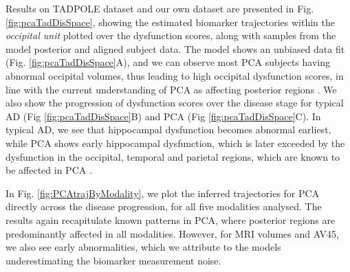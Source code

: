 \documentclass{llncs}
\begin{document}




Results on TADPOLE dataset and our own dataset are presented in Fig. \ref{fig:pcaTadDisSpace}, showing the estimated biomarker trajectories within the \emph{occipital unit} plotted over the dysfunction scores, along with samples from the model posterior and aligned subject data. The model shows an unbiased data fit (Fig. \ref{fig:pcaTadDisSpace}A), and we can observe most PCA subjects having abnormal occipital volumes, thus leading to high occipital dysfunction scores, in line with the current understanding of PCA as affecting posterior regions \cite{crutch2012posterior}. We also show the progression of dysfunction scores over the disease stage for typical AD (Fig \ref{fig:pcaTadDisSpace}B) and PCA (Fig \ref{fig:pcaTadDisSpace}C). In typical AD, we see that hippocampal dysfunction becomes abnormal earliest, while PCA shows early hippocampal dysfunction, which is later exceeded by the dysfunction in the occipital, temporal and parietal regions, which are known to be affected in PCA \cite{crutch2012posterior}. 

In Fig. \ref{fig:PCAtrajByModality}, we plot the inferred trajectories for PCA directly across the disease progression, for all five modalities analysed. The results again recapitulate known patterns in PCA, where posterior regions are predominantly affected in all modalities. However, for MRI volumes and AV45, we also see early abnormalities, which we attribute to the models underestimating the biomarker measurement noise.
\end{document}
